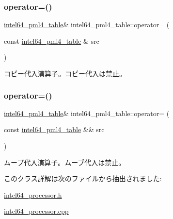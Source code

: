 \subsubsection{\texorpdfstring{operator=()}{operator=()}\hspace{0.1cm}{\footnotesize\ttfamily [1/2]}}
{\footnotesize\ttfamily \hyperlink{classintel64__pml4__table}{intel64\+\_\+pml4\+\_\+table}\& intel64\+\_\+pml4\+\_\+table\+::operator= (\begin{DoxyParamCaption}\item[{const \hyperlink{classintel64__pml4__table}{intel64\+\_\+pml4\+\_\+table} \&}]{src }\end{DoxyParamCaption})\hspace{0.3cm}{\ttfamily [delete]}}

コピー代入演算子。コピー代入は禁止。 \hypertarget{classintel64__pml4__table_a3f80097387464f4404300ba83c14eca4}{}\label{classintel64__pml4__table_a3f80097387464f4404300ba83c14eca4} 
\subsubsection{\texorpdfstring{operator=()}{operator=()}\hspace{0.1cm}{\footnotesize\ttfamily [2/2]}}
{\footnotesize\ttfamily \hyperlink{classintel64__pml4__table}{intel64\+\_\+pml4\+\_\+table}\& intel64\+\_\+pml4\+\_\+table\+::operator= (\begin{DoxyParamCaption}\item[{const \hyperlink{classintel64__pml4__table}{intel64\+\_\+pml4\+\_\+table} \&\&}]{src }\end{DoxyParamCaption})\hspace{0.3cm}{\ttfamily [delete]}}

ムーブ代入演算子。ムーブ代入は禁止。 

このクラス詳解は次のファイルから抽出されました\+:\begin{DoxyCompactItemize}
\item 
\hyperlink{intel64__processor_8h}{intel64\+\_\+processor.\+h}\item 
\hyperlink{intel64__processor_8cpp}{intel64\+\_\+processor.\+cpp}\end{DoxyCompactItemize}
